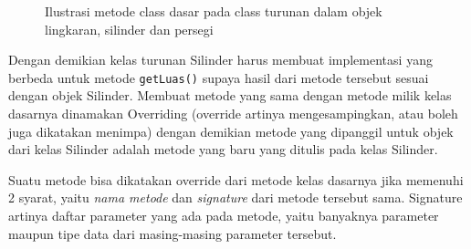 \begin{figure}[htbp]
\centering
{}
\caption{Ilustrasi metode class dasar pada class turunan dalam objek lingkaran, silinder dan persegi}
\end{figure}

Dengan demikian kelas turunan Silinder harus membuat implementasi yang
berbeda untuk metode \texttt{getLuas()} supaya hasil dari metode
tersebut sesuai dengan objek Silinder. Membuat metode yang sama dengan
metode milik kelas dasarnya dinamakan Overriding (override artinya
mengesampingkan, atau boleh juga dikatakan menimpa) dengan demikian
metode yang dipanggil untuk objek dari kelas Silinder adalah metode yang
baru yang ditulis pada kelas Silinder.

Suatu metode bisa dikatakan override dari metode kelas dasarnya jika
memenuhi 2 syarat, yaitu \emph{nama metode} dan \emph{signature} dari
metode tersebut sama. Signature artinya daftar parameter yang ada pada
metode, yaitu banyaknya parameter maupun tipe data dari masing-masing
parameter tersebut.

